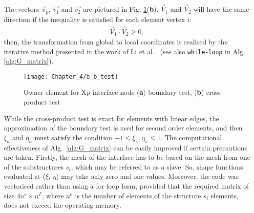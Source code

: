 The vectors \(\vec{v}_p\), \(\vec{v_1}\) and \(\vec{v_2}\) are pictured in Fig. \ref{fig:b_b_test}(\textbf{b}). \(\vec{V}_1\) and \(\vec{V}_2\) will have the same direction if the inequality is satisfied for each element vertex \(i\):
\begin{eqnarray}
		\vec{V}_1 \cdot \vec{V}_2 \geq0,
	\label{eq:dot_prod}
\end{eqnarray}
then, the transformation from global to local coordinates is realised by the iterative method presented in the work of Li et al.~\cite{li2014efficient} (see also \verb+while-loop+ in Alg. \ref{alg:G_matrix}).
\begin{figure}[H]
	\begin{center}
		\texttt{[image: Chapter\_4/b\_b\_test]}
	\end{center}
	\caption{Owner element for Xp interface node (\textbf{a}) boundary test, (\textbf{b}) cross-product test}
	\label{fig:b_b_test}
\end{figure}
While the cross-product test is exact for elements with linear edges, the approximation of the boundary test is used for second order elements, and then \(\xi_{\kappa}\) and \(\eta_{\kappa}\) must satisfy the condition \(-1\leq \xi_{\kappa},\eta_{\kappa} \leq 1\).
The computational effectiveness of Alg.~\ref{alg:G_matrix} can be easily improved if certain precautions are taken.
Firstly, the mesh of the interface has to be based on the mesh from one of the substructures \(s_{i}\), which may be referred to as a slave.
So, shape functions evaluated at (\(\xi\), \(\eta\)) may take only zero and one values.
Moreover, the code was vectorised rather than using a for-loop form, provided that the required matrix of size \(4n^e\times n^{\Gamma}\), where \(n^e\) is the number of elements of the structure \(s_i\) elements, does not exceed the operating memory.